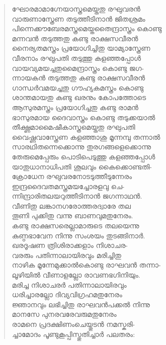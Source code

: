 \begin{verse}
ഘോരമാമാഗ്നേയാസ്ത്രമെയ്തതു രഘുവരന്‍\\
വാരുണാസ്ത്രേണ തടുത്തീടിനാന്‍ ജിതശ്രമം\\
പിന്നെക്കൗബേരമസ്ത്രമെയ്തതൈന്ദ്രാസ്ത്രം കൊണ്ടു\\
മന്നവന്‍ തടുത്തതു കണ്ടു രാക്ഷസവീരന്‍\\
നൈര്യതമസ്ത്രം പ്രയോഗിച്ചിതു യാമ്യാസ്ത്രേണ\\
വീരനാം രഘുപതി തടുത്തു കളഞ്ഞപ്പോള്‍\\
വായവ്യമയച്ചതുമൈന്ദ്രാസ്ത്രം കൊണ്ടു ജഗ-\\
ന്നായകന്‍ തടുത്തതു കണ്ടു രാക്ഷസവീരന്‍\\
ഗാന്ധര്‍വമയച്ചതു ഗൗഹ്യകമസ്ത്രം കൊണ്ടു\\
ശാന്തമായതു കണ്ടു ഖരനും കോപത്തോടെ\\
ആസുരമസ്ത്രം പ്രയോഗിച്ചതു കണ്ടു രാമന്‍\\
ഭാസുരമായ ദൈവാസ്ത്രം കൊണ്ടു തടുക്കയാല്‍\\
തീക്ഷ്ണമാമൈഷീകാസ്ത്രമെയ്തതു രഘുപതി\\
വൈഷ്ണവാസ്ത്രേണ കളഞ്ഞാശു മൂന്നമ്പു തന്നാല്‍\\
സാരഥിതന്നെക്കൊന്നു തുരഗങ്ങളെക്കൊന്നു\\
തേരുമെപ്പേരും പൊടിപെടുത്തു കളഞ്ഞപ്പോള്‍\\
യാതുധാനാധിപതി ശൂലവും കൈക്കൊണ്ടതി-\\
ക്രോധേന രഘുവരനോടടുത്തീടുന്നേരം\\
ഇന്ദ്രദൈവതമസ്ത്രമയച്ചോരളവു ചെ-\\
ന്നിന്ദ്രാരിതലയറുത്തീടിനാന്‍ ജഗന്നാഥന്‍.\\
വീണിതു ലങ്കാനഗരോത്തരദ്വാരേ തല\\
തൂണി പുക്കിതു വന്നു ബാണവുമതുനേരം.\\
കണ്ടു രാക്ഷസരെല്ലാമാരുടെ തലയെന്നു\\
കുണ്ഠഭാവേന നിന്നു സംശയം തുടങ്ങിനാര്‍.\\
ഖരദൂഷണ ത്രിശിരാക്കളാം നിശാചര-\\
വരരും പതിന്നാലായിരവും മരിച്ചിതു\\
നാഴിക മൂന്നേമുക്കാല്‍കൊണ്ടു രാഘവന്‍ തന്നാ-\\
ലൂഴിയില്‍ വീണാളല്ലോ രാവണഭഗിനിയും.\\
മരിച്ച നിശാചരര്‍ പതിന്നാലായിരവും\\
ധരിച്ചാരല്ലോ ദിവ്യവിഗ്രഹമതുനേരം\\
ജ്ഞാനവും ലഭിച്ചിതു രാഘവന്‍പക്കല്‍ നിന്നു\\
മാനസേ പുനരവരേവരുമതുനേരം\\
രാമനെ പ്രദക്ഷിണംചെയ്തുടന്‍ നമസ്കരി-\\
ച്ചാമോദം പൂണ്ടുകൂപ്പിസ്തുതിച്ചാര്‍ പലതരം:\\

\end{verse}
